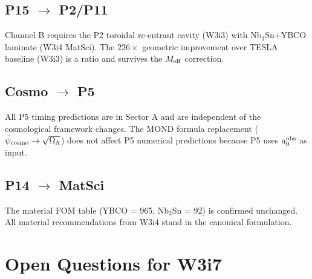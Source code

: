 \documentclass[11pt]{article}
\newcommand{\psicosmo}{\bar{\psi}_{\rm cosmo}}
\newcommand{\aM}{a_0}
\newcommand{\Meff}{M_{\rm eff}}
\begin{document}
\subsection{P15 $\to$ P2/P11}

Channel B requires the P2 toroidal re-entrant cavity (W3i3) with
Nb$_3$Sn+YBCO laminate (W3i4 MatSci). The $226\times$ geometric
improvement over TESLA baseline (W3i3) is a ratio and survives
the $\Meff$ correction.

\subsection{Cosmo $\to$ P5}

All P5 timing predictions are in Sector A and are independent of the
cosmological framework changes. The MOND formula replacement
($\psicosmo \to \sqrt{\Omega_\Lambda}$) does not affect P5 numerical
predictions because P5 uses $\aM^{\rm obs}$ as input.

\subsection{P14 $\to$ MatSci}

The material FOM table (YBCO = 965, Nb$_3$Sn = 92) is confirmed
unchanged. All material recommendations from W3i4 stand in the
canonical formulation.

\section{Open Questions for W3i7}
\label{sec:open}
\end{document}
